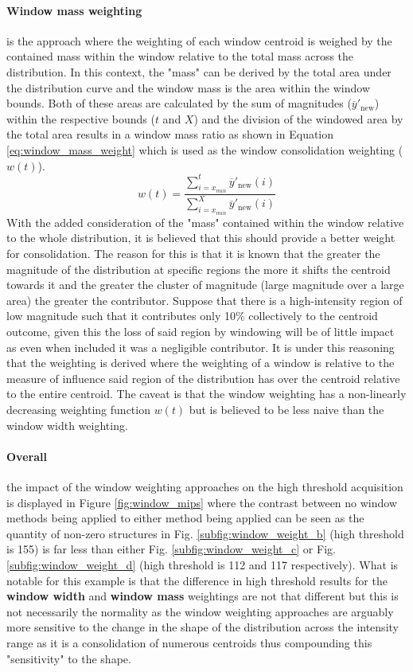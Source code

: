 \paragraph{Window mass weighting} is the approach where the weighting of each window centroid is weighed by the contained mass within the window relative to the total mass across the distribution. In this context, the "mass" can be derived by the total area under the distribution curve and the window mass is the area within the window bounds. Both of these areas are calculated by the sum of magnitudes ($\overline{y}'_{\text{new}}$) within the respective bounds ($t$ and $X$) and the division of the windowed area by the total area results in a window mass ratio as shown in Equation \ref{eq:window_mass_weight} which is used as the window consolidation weighting ($w(t)$).  
\begin{equation}\label{eq:window_mass_weight}
    w(t) = \frac{\sum_{i=x_{min}}^t \overline{y}'_{\text{new}}(i)}{\sum_{i=x_{min}}^X \overline{y}'_{\text{new}}(i)}
\end{equation}
With the added consideration of the "mass" contained within the window relative to the whole distribution, it is believed that this should provide a better weight for consolidation. The reason for this is that it is known that the greater the magnitude of the distribution at specific regions the more it shifts the centroid towards it and the greater the cluster of magnitude (large magnitude over a large area) the greater the contributor. Suppose that there is a high-intensity region of low magnitude such that it contributes only 10\% collectively to the centroid outcome, given this the loss of said region by windowing will be of little impact as even when included it was a negligible contributor. It is under this reasoning that the weighting is derived where the weighting of a window is relative to the measure of influence said region of the distribution has over the centroid relative to the entire centroid. The caveat is that the window weighting has a non-linearly decreasing weighting function $w(t)$ but is believed to be less naive than the window width weighting.\paragraph{Overall} the impact of the window weighting approaches on the high threshold acquisition is displayed in Figure \ref{fig:window_mips} where the contrast between no window methods being applied to either method being applied can be seen as the quantity of non-zero structures in Fig. \ref{subfig:window_weight_b} (high threshold is 155) is far less than either Fig. \ref{subfig:window_weight_c} or Fig. \ref{subfig:window_weight_d} (high threshold is 112 and 117 respectively). What is notable for this example is that the difference in high threshold results for the \textbf{window width} and \textbf{window mass} weightings are not that different but this is not necessarily the normality as the window weighting approaches are arguably more sensitive to the change in the shape of the distribution across the intensity range as it is a consolidation of numerous centroids thus compounding this "sensitivity" to the shape.

